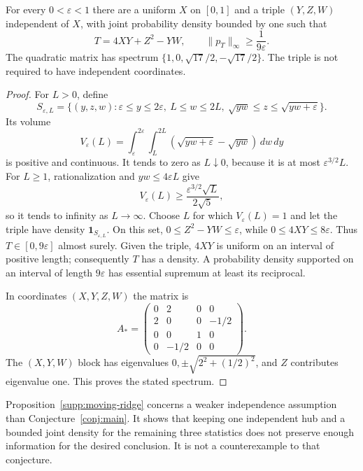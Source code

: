 \begin{proposition}
\label{supp:moving-ridge}
For every $0<\varepsilon<1$ there are a uniform $X$ on $[0,1]$
and a triple $(Y,Z,W)$ independent of $X$, with joint probability density
bounded by one such that
\[
 T=4XY+Z^2-YW,\qquad \|p_T\|_\infty\ge\frac1{9\varepsilon}.
\]
The quadratic matrix has spectrum
$\{1,0,\sqrt{17}/2,-\sqrt{17}/2\}$.  The triple is not required
to have independent coordinates.
\end{proposition}
\begin{proof}
For $L>0$, define
\[
 S_{\varepsilon,L}=
 \{(y,z,w):\varepsilon\le y\le2\varepsilon,
       \ L\le w\le2L,
       \ \sqrt{yw}\le z\le\sqrt{yw+\varepsilon}\}.
\]
Its volume
\[
 V_\varepsilon(L)=\int_\varepsilon^{2\varepsilon}
       \int_L^{2L}
       (\sqrt{yw+\varepsilon}-\sqrt{yw})\,dw\,dy
\]
is positive and continuous.  It tends to zero as $L\downarrow0$,
because it is at most $\varepsilon^{3/2}L$.
For $L\ge1$, rationalization and $yw\le4\varepsilon L$ give
\[
 V_\varepsilon(L)\ge
    \frac{\varepsilon^{3/2}\sqrt L}{2\sqrt5},
\]
so it tends to infinity as $L\to\infty$.  Choose $L$ for which
$V_\varepsilon(L)=1$ and let the triple have density
$\mathbf1_{S_{\varepsilon,L}}$.
On this set, $0\le Z^2-YW\le\varepsilon$, while
$0\le4XY\le8\varepsilon$.  Thus $T\in[0,9\varepsilon]$
almost surely.  Given the triple, $4XY$ is uniform on an interval
of positive length; consequently $T$ has a density.  A probability
density supported on an interval of length $9\varepsilon$ has
essential supremum at least its reciprocal.

In coordinates $(X,Y,Z,W)$ the matrix is
\[
 A_*=\begin{pmatrix}
 0&2&0&0\\2&0&0&-1/2\\0&0&1&0\\0&-1/2&0&0
 \end{pmatrix}.
\]
The $(X,Y,W)$ block has eigenvalues
$0,\pm\sqrt{2^2+(1/2)^2}$, and $Z$ contributes eigenvalue one.
This proves the stated spectrum.
\end{proof}

Proposition~\ref{supp:moving-ridge} concerns a weaker independence
assumption than Conjecture~\ref{conj:main}.  It shows that keeping
one independent hub and a bounded joint density for the remaining
three statistics does not preserve enough information for the
desired conclusion.  It is not a counterexample to that conjecture.
